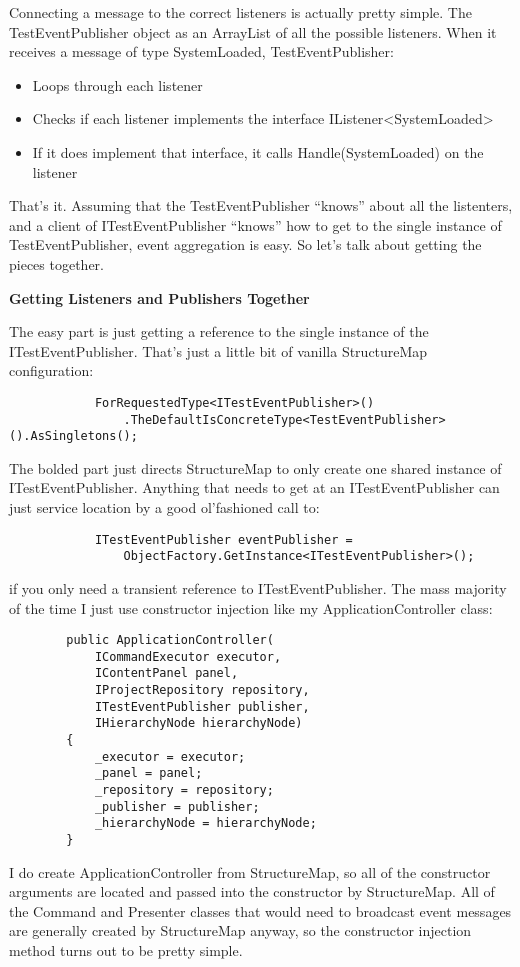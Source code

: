 \documentclass{article}
\begin{document}
{Connecting a message to the correct listeners is actually pretty simple.  The TestEventPublisher object as an ArrayList of all the possible listeners.  When it receives a message of type SystemLoaded, TestEventPublisher:

 \begin{itemize}
 \item  Loops through each listener  
 \item  Checks if each listener implements the interface IListener<SystemLoaded>  
 \item  If it does implement that interface, it calls Handle(SystemLoaded) on the listener  
 \end{itemize}
 
That's it.  Assuming that the TestEventPublisher “knows” about all the listenters, and a client of ITestEventPublisher “knows” how to get to the single instance of TestEventPublisher, event aggregation is easy.  So let's talk about getting the pieces together.

 
\Large {\textbf{Getting Listeners and Publishers Together}}

The easy part is just getting a reference to the single instance of the ITestEventPublisher.  That's just a little bit of vanilla StructureMap configuration:
\begin{lstlisting}
            ForRequestedType<ITestEventPublisher>()
                .TheDefaultIsConcreteType<TestEventPublisher>().AsSingletons();
\end{lstlisting}
The bolded part just directs StructureMap to only create one shared instance of ITestEventPublisher.  Anything that needs to get at an ITestEventPublisher can just service location by a good ol'fashioned call to:
\begin{lstlisting}
            ITestEventPublisher eventPublisher = 
                ObjectFactory.GetInstance<ITestEventPublisher>();
\end{lstlisting}
\newpage
if you only need a transient reference to ITestEventPublisher.  The mass majority of the time I just use constructor injection like my ApplicationController class:
\begin{lstlisting}
        public ApplicationController(
            ICommandExecutor executor, 
            IContentPanel panel, 
            IProjectRepository repository,
            ITestEventPublisher publisher, 
            IHierarchyNode hierarchyNode)
        {
            _executor = executor;
            _panel = panel;
            _repository = repository;
            _publisher = publisher;
            _hierarchyNode = hierarchyNode;
        }
\end{lstlisting}
I do create ApplicationController from StructureMap, so all of the constructor arguments are located and passed into the constructor by StructureMap.  All of the Command and Presenter classes that would need to broadcast event messages are generally created by StructureMap anyway, so the constructor injection method turns out to be pretty simple.

}
\end{document}

